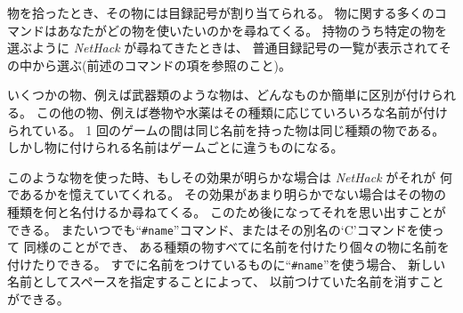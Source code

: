 物を拾ったとき、その物には目録記号が割り当てられる。
物に関する多くのコマンドはあなたがどの物を使いたいのかを尋ねてくる。
持物のうち特定の物を選ぶように {\it NetHack\/} が尋ねてきたときは、
普通目録記号の一覧が表示されてその中から選ぶ(前述のコマンドの項を参照のこと)。

いくつかの物、例えば武器類のような物は、どんなものか簡単に区別が付けられる。
この他の物、例えば巻物や水薬はその種類に応じていろいろな名前が付けられている。
1 回のゲームの間は同じ名前を持った物は同じ種類の物である。
しかし物に付けられる名前はゲームごとに違うものになる。

このような物を使った時、もしその効果が明らかな場合は {\it NetHack\/} がそれが
何であるかを憶えていてくれる。
その効果があまり明らかでない場合はその物の種類を何と名付けるか尋ねてくる。
このため後になってそれを思い出すことができる。
またいつでも``{\tt \#name}''コマンド、またはその別名の`C'コマンドを使って
同様のことができ、
ある種類の物すべてに名前を付けたり個々の物に名前を付けたりできる。
すでに名前をつけているものに``{\tt \#name}''を使う場合、
新しい名前としてスペースを指定することによって、
以前つけていた名前を消すことができる。

